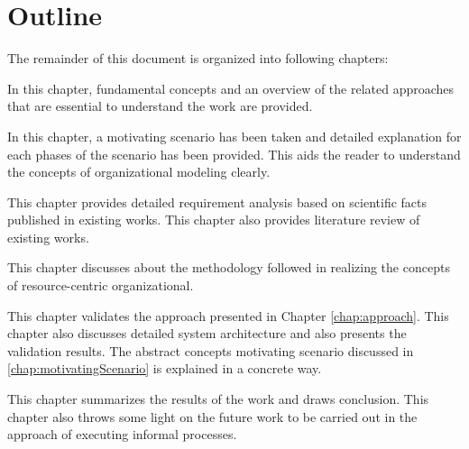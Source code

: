 \section {Outline}
\label{sec:outline}
The remainder of this document is organized into following chapters:
\begin{description} [labelwidth = 0.07\textwidth]
	\item[Chapter ~\ref{chap:fundamentals} -- \nameref{chap:fundamentals}:] In this chapter, fundamental concepts and an overview of the related approaches that are essential to understand the work are provided.
	\item[Chapter ~\ref{chap:motivatingScenario} -- \nameref{chap:motivatingScenario}:] In this chapter, a motivating scenario has been taken and detailed explanation for each phases of the scenario has been provided. This aids the reader to understand the concepts of organizational modeling clearly. 
	\item [Chapter ~\ref{chap:analysis} --\textbf{Requirements for Supporting Intention-oriented Organizational Modeling}:] This chapter provides detailed requirement analysis based on scientific facts published in existing works. This chapter also provides literature review of existing works.
	\item[Chapter ~\ref{chap:approach} -- \nameref{chap:approach}:] This chapter discusses about the methodology followed in realizing the concepts  of resource-centric organizational.
	\item[Chapter ~\ref{chap:casestudy} -- \nameref{chap:casestudy}:] This chapter validates the approach presented in Chapter \ref{chap:approach}. This chapter also discusses detailed system architecture and also presents the validation results. The abstract concepts motivating scenario discussed in \ref{chap:motivatingScenario} is explained in a concrete way.	
	\item[Chapter ~\ref{chap:conclusion} -- \nameref{chap:conclusion}:] This chapter summarizes the results of the work and draws conclusion. This chapter also throws some light on the future work to be carried out in the approach of executing informal processes. 
\end{description}